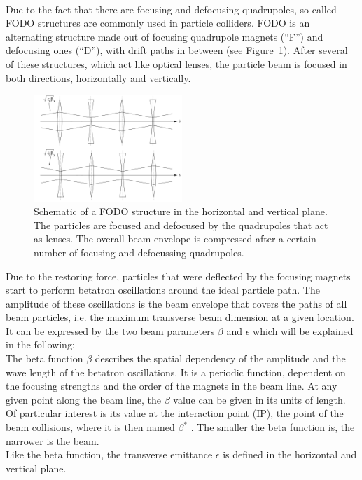 \\Due to the fact that there are focusing and defocusing quadrupoles, so-called FODO structures are commonly used in particle colliders.
FODO is an alternating structure made out of focusing quadrupole magnets (``F'') and defocusing ones (``D''), with drift paths in between (see Figure~\ref{fig:FODO}).
After several of these structures, which act like optical lenses, the particle beam is focused in both directions, horizontally and vertically.
\begin{figure}
\centering
\includegraphics[width=0.5\textwidth]{Figures/FODO.png}
\caption[Schematic of FODO structure]{Schematic of a FODO structure in the horizontal and vertical plane. The particles are focused and defocused by the quadrupoles that act as lenses. The overall beam envelope is compressed after a certain number of focusing and defocussing quadrupoles.~\cite[p. 65]{Hinterberger}}
\label{fig:FODO}
\end{figure}
Due to the restoring force, particles that were deflected by the focusing magnets start to perform betatron oscillations around the ideal particle path.
The amplitude of these oscillations is the beam envelope that covers the paths of all beam particles, i.e. the maximum transverse beam dimension at a given location.
It can be expressed by the two beam parameters $\beta$ and $\epsilon$ which will be explained in the following:\\
The beta function $\beta$ describes the spatial dependency of the amplitude and the wave length of the betatron oscillations.
It is a periodic function, dependent on the focusing strengths and the order of the magnets in the beam line.
At any given point along the beam line, the $\beta$ value can be given in its units of length.
Of particular interest is its value at the interaction point (IP), the point of the beam collisions, where it is then  named $\beta^*$ .
The smaller the beta function is, the narrower is the beam.\\
Like the beta function, the transverse emittance $\epsilon$ is defined in the horizontal and vertical plane.
